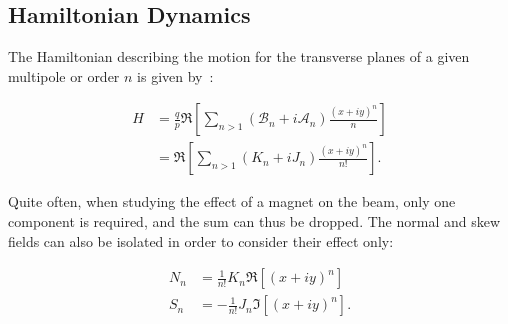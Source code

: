 \subsection{Hamiltonian Dynamics}

The Hamiltonian describing the motion for the transverse planes of a given multipole or order $n$ is
given by~\cite{keintzel_jacqueline_beam_nodate,tomas_direct_2003,franchi_studies_2006}:

\begin{equation}
    \begin{aligned}
        H &= \frac{q}{p} \Re \left[ \sum_{n>1} (\mathcal{B}_n + i\mathcal{A}_n) \frac{(x+iy)^n}{n} \right] \\
          &= \Re \left[ \sum_{n>1} (K_n + iJ_n) \frac{(x+iy)^n}{n!} \right].
    \end{aligned}
    \label{eq:hamiltonian_magnet}
\end{equation}

Quite often, when studying the effect of a magnet on the beam, only one component is required, and
the sum can thus be dropped.
The normal and skew fields can also be isolated in order to consider their effect only:

\begin{equation}
    \begin{aligned}
        N_n &= \frac{1}{n!} K_n \Re \left[ (x+iy)^n \right] \\
        S_n &= -\frac{1}{n!} J_n \Im \left[ (x+iy)^n \right].
    \end{aligned}
    \label{eq:normal_skew_hamiltonian_magnet}
\end{equation}



